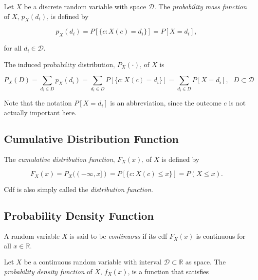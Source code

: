 \documentclass{article}
\begin{document}
            Let $ X $ be a discrete random variable with space $ \mathcal{D} $.
            The \textit{probability mass function} of $ X $, $ p_{X}(d_{i}) $,
            is defined by

            \begin{equation*}
                p_{X}(d_{i}) = P[\{ c: X(c) = d_{i} \}] = P[ X = d_{i} ],
            \end{equation*}

            for all $ d_{i} \in \mathcal{D} $.

            The induced probability distribution, $ P_{X}(\cdot) $, of $ X $ is

            \begin{equation*}
                P_{X}(D) = \sum_{ d_{i} \in D} p_{X}(d_{i}) = \sum_{ d_{i} \in
                D} P[\{ c: X(c) = d_{i} \}] = \sum_{d_{i} \in D} P[ X = d_{i}],
                \text{ } D \subset \mathcal{D}
            \end{equation*}

            Note that the notation $ P[ X = d_{i}] $ is an abbreviation, since
            the outcome $ c $ is not actually important here.

        \subsection{Cumulative Distribution Function}

            The \textit{cumulative distribution function}, $ F_{X}(x) $, of $ X
            $ is defined by

            \begin{equation*}
                F_{X}(x) = P_{X}((-\infty, x]) = P[\{ c: X(c) \leq x \}] = P (
                { X \leq x } ).
            \end{equation*}

            Cdf is also simply called the \textit{distribution function}.

        \subsection{Probability Density Function}

            A random variable $ X $ is said to be \textit{continuous} if
            its cdf $ F_{X}(x) $ is continuous for all $ x \in \mathbb{R} $.

            Let $ X $ be a continuous random variable with interval $
            \mathcal{D} \subset \mathbb{R} $ as space. The \textit{probability
            density function} of $ X $, $ f_{X}(x) $, is a function that
            satisfies
\end{document}
